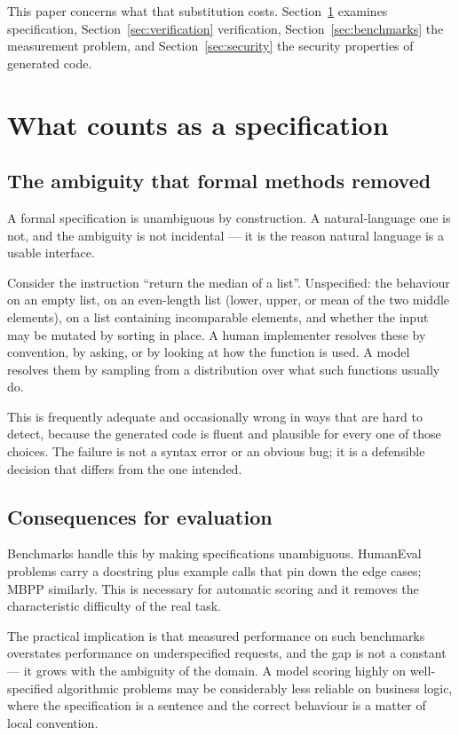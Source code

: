 \documentclass[11pt,a4paper]{article}
\begin{document}
This paper concerns what that substitution costs. Section~\ref{sec:spec}
examines specification, Section~\ref{sec:verification} verification,
Section~\ref{sec:benchmarks} the measurement problem, and
Section~\ref{sec:security} the security properties of generated code.

\section{What counts as a specification}
\label{sec:spec}

\subsection{The ambiguity that formal methods removed}

A formal specification is unambiguous by construction. A natural-language one
is not, and the ambiguity is not incidental --- it is the reason natural
language is a usable interface.

Consider the instruction ``return the median of a list''. Unspecified: the
behaviour on an empty list, on an even-length list (lower, upper, or mean of
the two middle elements), on a list containing incomparable elements, and
whether the input may be mutated by sorting in place. A human implementer
resolves these by convention, by asking, or by looking at how the function is
used. A model resolves them by sampling from a distribution over what such
functions usually do.

This is frequently adequate and occasionally wrong in ways that are hard to
detect, because the generated code is fluent and plausible for every one of
those choices. The failure is not a syntax error or an obvious bug; it is a
defensible decision that differs from the one intended.

\subsection{Consequences for evaluation}

Benchmarks handle this by making specifications unambiguous. HumanEval
\cite{chen2021} problems carry a docstring plus example calls that pin down
the edge cases; MBPP \cite{austin2021} similarly. This is necessary for
automatic scoring and it removes the characteristic difficulty of the real
task.

The practical implication is that measured performance on such benchmarks
overstates performance on underspecified requests, and the gap is not a
constant --- it grows with the ambiguity of the domain. A model scoring highly
on well-specified algorithmic problems may be considerably less reliable on
business logic, where the specification is a sentence and the correct
behaviour is a matter of local convention.
\end{document}
